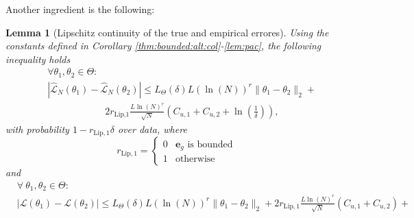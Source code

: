 \documentclass{article}
\newtheorem{lemma}[theorem]{Lemma}
\newcommand{\e}{\mathbf{e}}
\begin{document}
Another ingredient is the following:
\begin{lemma}[Lipschitz continuity of the true and empirical errores]
  \label{pac:lipsch:loss}
   Using the constants defined in Corollary \ref{thm:bounded:alt:col}-\ref{lem:pac}, 
   the following inequality holds
   \begin{equation}
   \label{pac:lipschitz:loss:eq31}
   \begin{aligned}
     & \forall \theta_1,\theta_2 \in \Theta:\\
          &|\hat{\mathcal{L}}_N(\theta_1) - \hat{\mathcal{L}}_N(\theta_2)| \le L_{\Theta}(\delta) L(\ln(N))^r \|\theta_1 - \theta_2\|_2
           +  \\
           & \qquad\qquad\qquad 2r_{\text{Lip,1}}\frac{L\ln(N)^{r}}{\sqrt{N}}\left(C_{u,1} + C_{u,2}+\ln\left(\frac{1}{\delta}\right)\right), 
   \end{aligned}
   \end{equation}  
   with probability $1-r_{\text{Lip},1}\delta$ over data, 
   where 
   $$ r_{\text{Lip},1}=\left\{\begin{array}{ll} 0 & \e_g \mbox{ is bounded } \\ 1 & \mbox{otherwise} \end{array}\right.$$ 
   and 
   \begin{equation}
   \label{pac:lipschitz:loss:eq32}
   \begin{aligned}
       & \forall ~ \theta_1,\theta_2 \in \Theta: \quad \\
          & |\mathcal{L}(\theta_1) - \mathcal{L}(\theta_2)| \le L_{\Theta}(\delta) L(\ln(N))^r \|\theta_1 - \theta_2\|_2
          + 2r_{\text{Lip},1}\frac{L\ln(N)^{r}}{\sqrt{N}}\left(C_{u,1} + C_{u,2}\right) + \\

\end{aligned}
\end{equation}
\end{lemma}
\end{document}
